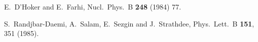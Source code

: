 \documentclass[a4paper,12pt]{article}
\begin{document}
\begin{thebibliography}{99}
E.~D'Hoker and E.~Farhi,
Nucl.\ Phys.\ B {\bf 248} (1984) 77.

S.~Randjbar-Daemi, A.~Salam, E.~Sezgin and J.~Strathdee,
Phys.\ Lett.\ B {\bf 151}, 351 (1985).

\end{thebibliography}
\end{document}
